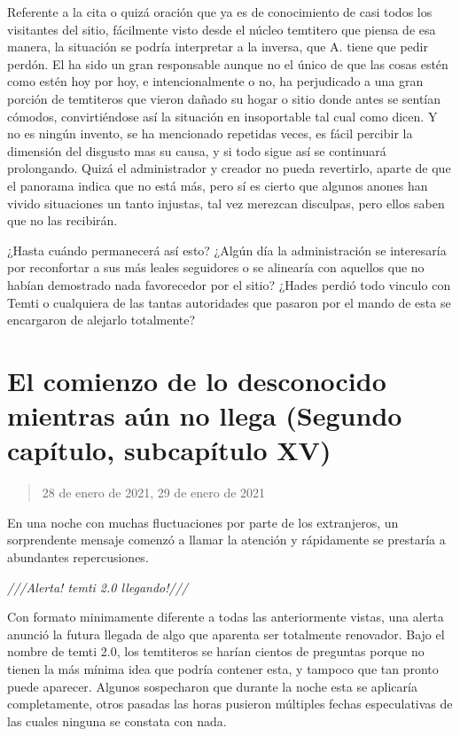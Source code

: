 \documentclass[
  spanish,
]{book}
\begin{document}
Referente a la cita o quizá oración que ya es de conocimiento de casi todos los visitantes del sitio, fácilmente visto desde el núcleo temtitero que piensa de esa manera, la situación se podría interpretar a la inversa, que A. tiene que pedir perdón. El ha sido un gran responsable aunque no el único de que las cosas estén como estén hoy por hoy, e intencionalmente o no, ha perjudicado a una gran porción de temtiteros que vieron dañado su hogar o sitio donde antes se sentían cómodos, convirtiéndose así la situación en insoportable tal cual como dicen. Y no es ningún invento, se ha mencionado repetidas veces, es fácil percibir la dimensión del disgusto mas su causa, y si todo sigue así se continuará prolongando. Quizá el administrador y creador no pueda revertirlo, aparte de que el panorama indica que no está más, pero sí es cierto que algunos anones han vivido situaciones un tanto injustas, tal vez merezcan disculpas, pero ellos saben que no las recibirán.

¿Hasta cuándo permanecerá así esto? ¿Algún día la administración se interesaría por reconfortar a sus más leales seguidores o se alinearía con aquellos que no habían demostrado nada favorecedor por el sitio? ¿Hades perdió todo vinculo con Temti o cualquiera de las tantas autoridades que pasaron por el mando de esta se encargaron de alejarlo totalmente?

\hypertarget{el-comienzo-de-lo-desconocido-mientras-auxfan-no-llega-segundo-capuxedtulo-subcapuxedtulo-xv}{%
\section{El comienzo de lo desconocido mientras aún no llega (Segundo capítulo, subcapítulo XV)}\label{el-comienzo-de-lo-desconocido-mientras-auxfan-no-llega-segundo-capuxedtulo-subcapuxedtulo-xv}}

\begin{quote}
28 de enero de 2021, 29 de enero de 2021
\end{quote}

En una noche con muchas fluctuaciones por parte de los extranjeros, un sorprendente mensaje comenzó a llamar la atención y rápidamente se prestaría a abundantes repercusiones.

\emph{///Alerta! temti 2.0 llegando!///}

Con formato minimamente diferente a todas las anteriormente vistas, una alerta anunció la futura llegada de algo que aparenta ser totalmente renovador.
Bajo el nombre de temti 2.0, los temtiteros se harían cientos de preguntas porque no tienen la más mínima idea que podría contener esta, y tampoco que tan pronto puede aparecer. Algunos sospecharon que durante la noche esta se aplicaría completamente, otros pasadas las horas pusieron múltiples fechas especulativas de las cuales ninguna se constata con nada.
\end{document}
